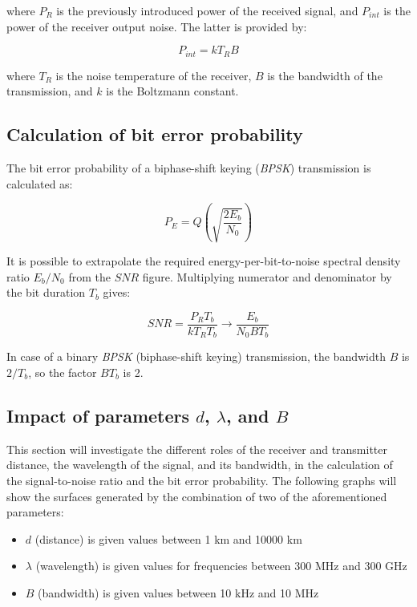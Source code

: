 where $P_R$ is the previously introduced power of the received signal, and $P_{int}$ is the power of the receiver output noise.
The latter is provided by:

\begin{equation}
	P_{int} = k T_R B
\end{equation}

where $T_R$ is the noise temperature of the receiver, $B$ is the bandwidth of the transmission, and $k$ is the Boltzmann constant.


\subsection{Calculation of bit error probability}
The bit error probability of a biphase-shift
keying (\emph{BPSK}) transmission is calculated as:

\begin{equation}
	P_E = Q\left(\sqrt{\frac{2 E_b}{N_0}}\right)
\end{equation}

It is possible to extrapolate the required energy-per-bit-to-noise spectral density ratio $E_b/N_0$ from the $SNR$ figure.
Multiplying numerator and denominator by the bit duration $T_b$ gives:

\begin{equation}
	SNR = \frac{P_R T_b}{k T_R T_b} \rightarrow \frac{E_b}{N_0 B T_b}
\end{equation}

In case of a binary \emph{BPSK} (biphase-shift
keying) transmission, the bandwidth $B$ is $2/T_b$, so the factor $B T_b$ is 2.


\subsection{Impact of parameters $d$, $\lambda$, and $B$}
This section will investigate the different roles of the receiver and transmitter distance, the wavelength of the signal, and its bandwidth, in the calculation of the signal-to-noise ratio and the bit error probability.
The following graphs will show the surfaces generated by the combination of two of the aforementioned parameters:

\begin{itemize}
	\item $d$ (distance) is given values between 1 km and 10000 km
	\item $\lambda$ (wavelength) is given values for frequencies between 300 MHz and 300 GHz
	\item $B$ (bandwidth) is given values between 10 kHz and 10 MHz
\end{itemize}

